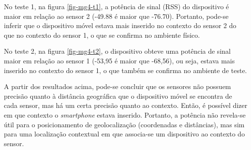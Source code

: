 No teste 1, na figura \autoref{fig-mg4-t1}, a potência de sinal (RSS) do dispositivo é maior em relação ao
sensor 2 (-49.88 é maior que -76.70). Portanto, pode-se inferir que o
dispositivo móvel estava mais inserido no contexto do sensor 2 do que no contexto
do sensor 1, o que se confirma no ambiente físico.

No teste 2, na figura \autoref{fig-mg4-t2}, o dispositivo obteve uma potência de sinal maior em relação ao
sensor 1 (-53,95 é maior que -68,56), ou seja, estava mais inserido no contexto
do sensor 1, o que também se confirma no ambiente de teste.

A partir dos resultados acima, pode-se concluir que os sensores não possuem
precisão quanto à distância geográfica que o dispositivo móvel se encontra de
cada sensor, mas há um certa precisão quanto ao contexto. Então, é possível
dizer em que contexto o \emph{smartphone} estava inserido. Portanto,
a potência não revela-se útil para o posicionamento de geolocalização
(coordenadas e distâncias), mas sim para uma localização
contextual em que associa-se um dispositivo ao contexto do sensor.


